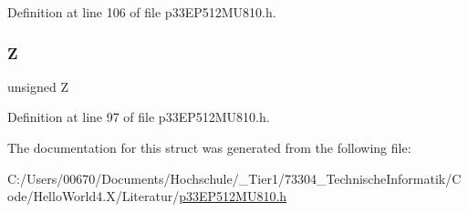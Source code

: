 Definition at line 106 of file p33\+E\+P512\+M\+U810.\+h.

\mbox{\label{structtag_s_r_b_i_t_s_ac908725f95d2f115071b18f9dc888e79}} 
\subsubsection{\texorpdfstring{Z}{Z}}
{\footnotesize\ttfamily unsigned Z}



Definition at line 97 of file p33\+E\+P512\+M\+U810.\+h.



The documentation for this struct was generated from the following file\+:\begin{DoxyCompactItemize}
\item 
C\+:/\+Users/00670/\+Documents/\+Hochschule/\+\_\+\+Tier1/73304\+\_\+\+Technische\+Informatik/\+Code/\+Hello\+World4.\+X/\+Literatur/\hyperlink{p33_e_p512_m_u810_8h}{p33\+E\+P512\+M\+U810.\+h}\end{DoxyCompactItemize}
